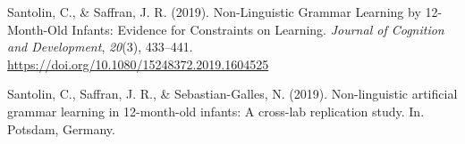 \begin{appendix}
\leavevmode\hypertarget{ref-santolin2019}{}%
Santolin, C., \& Saffran, J. R. (2019). Non-Linguistic Grammar Learning
by 12-Month-Old Infants: Evidence for Constraints on Learning.
\emph{Journal of Cognition and Development}, \emph{20}(3), 433--441.
\url{https://doi.org/10.1080/15248372.2019.1604525}

\leavevmode\hypertarget{ref-santolin2019a}{}%
Santolin, C., Saffran, J. R., \& Sebastian-Galles, N. (2019).
Non-linguistic artificial grammar learning in 12-month-old infants: A
cross-lab replication study. In. Potsdam, Germany.

\endgroup
\end{appendix}
